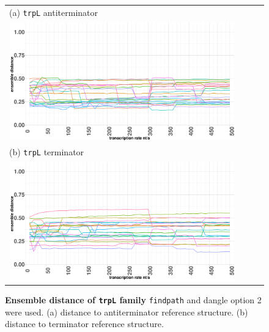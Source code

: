 \documentclass[ twoside,openright,titlepage,numbers=noenddot,headinclude,%
                footinclude=false, cleardoublepage=empty,abstractoff, %
                BCOR=5mm,paper=a4,fontsize=11pt,%
                ngerman,american,%
                ]{scrreprt}
\begin{document}
		
\begin{figure}
\begin{tabular}{l}
(a) \texttt{trpL} antiterminator \\
\includegraphics[width=0.9\textwidth]{./pictures/ensembleDistance/ensembleDistance_alternative1.pdf}\\
(b) \texttt{trpL} terminator \\
\includegraphics[width=0.9\textwidth]{./pictures/ensembleDistance/ensembleDistance_alternative2.pdf}\\
\end{tabular}
\caption{{\bf Ensemble distance of \texttt{trpL} family}
\texttt{findpath} and dangle option 2 were used.
(a) distance to antiterminator reference structure.
(b) distance to terminator reference structure.
}
\label{fig:ensembleDistanceTRP}
\end{figure}	
					
\end{document}
